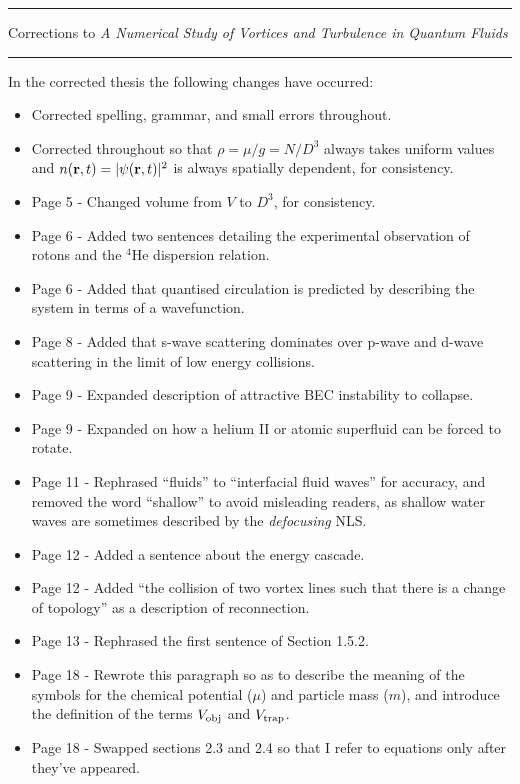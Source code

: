 \documentclass{article}
\begin{document}
\hrule
\vspace{4pt}
Corrections to {\it A Numerical Study of Vortices and Turbulence in Quantum Fluids}\\
\vspace{-1pt}
\hrule

In the corrected thesis the following changes have occurred:

\begin{itemize}
\item Corrected spelling, grammar, and small errors throughout.
\item Corrected throughout so that $\rho = \mu/g = N/D^3$ always takes uniform values and $n({\bf r},t) = |\psi({\bf r},t)|^2$ is always spatially dependent, for consistency.
\item Page 5 -  Changed volume from $V$ to $D^3$, for consistency.
\item Page 6 -  Added two sentences detailing the experimental observation of rotons and the $^4$He dispersion relation.
\item Page 6 -  Added that quantised circulation is predicted by describing the system in terms of a wavefunction.
\item Page 8 -  Added that s-wave scattering dominates over p-wave and d-wave scattering in the limit of low energy collisions.
\item Page 9 -  Expanded description of attractive BEC instability to collapse.
\item Page 9 -  Expanded on how a helium II or atomic superfluid can be forced to rotate.
\item Page 11 - Rephrased ``fluids'' to ``interfacial fluid waves'' for accuracy, and removed the word ``shallow'' to avoid misleading readers, as shallow water waves are sometimes described by the {\it defocusing} NLS. 
\item Page 12 - Added a sentence about the energy cascade.
\item Page 12 - Added ``the collision of two vortex lines such that there is a change of topology'' as a description of reconnection.
\item Page 13 - Rephrased the first sentence of Section 1.5.2.
\item Page 18 - Rewrote this paragraph so as to describe the meaning of the symbols for the chemical potential ($\mu$) and particle mass ($m$), and introduce the definition of the terms $V_{\rm obj}$ and $V_{\rm trap}$.
\item Page 18 - Swapped sections 2.3 and 2.4 so that I refer to equations only after they've appeared.

\end{itemize}
\end{document}
